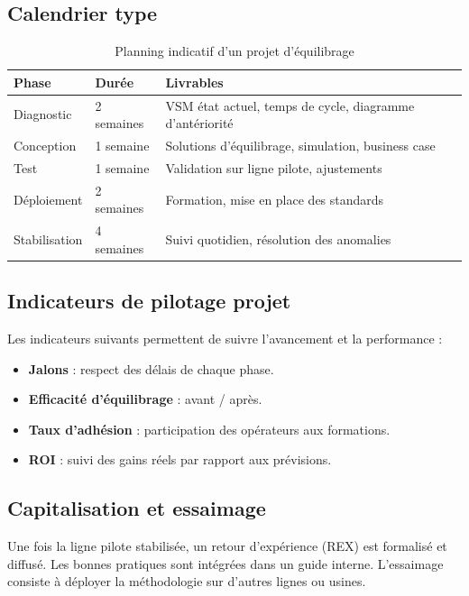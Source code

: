 \documentclass[12pt,a4paper]{article}
\begin{document}
\begin{center}
\subsection{Calendrier type}
\begin{table}[H]
\centering
\caption{Planning indicatif d’un projet d’équilibrage}
\label{tab:planning}
\begin{tabular}{|l|l|p{6cm}|}
\hline
\textbf{Phase} & \textbf{Durée} & \textbf{Livrables} \\ \hline
Diagnostic & 2 semaines & VSM état actuel, temps de cycle, diagramme d’antériorité \\
Conception & 1 semaine & Solutions d’équilibrage, simulation, business case \\
Test & 1 semaine & Validation sur ligne pilote, ajustements \\
Déploiement & 2 semaines & Formation, mise en place des standards \\
Stabilisation & 4 semaines & Suivi quotidien, résolution des anomalies \\
\hline
\end{tabular}
\end{table}

\subsection{Indicateurs de pilotage projet}
Les indicateurs suivants permettent de suivre l’avancement et la performance :
\begin{itemize}
    \item \textbf{Jalons} : respect des délais de chaque phase.
    \item \textbf{Efficacité d’équilibrage} : avant / après.
    \item \textbf{Taux d’adhésion} : participation des opérateurs aux formations.
    \item \textbf{ROI} : suivi des gains réels par rapport aux prévisions.
\end{itemize}

\subsection{Capitalisation et essaimage}
Une fois la ligne pilote stabilisée, un retour d’expérience (REX) est formalisé et diffusé. Les bonnes pratiques sont intégrées dans un guide interne. L’essaimage consiste à déployer la méthodologie sur d’autres lignes ou usines.


\end{center}
\end{document}

